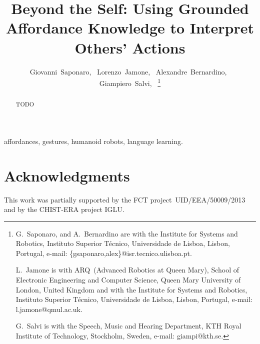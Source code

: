 \documentclass[journal]{IEEEtran}
\begin{document}
\title{Beyond the Self: Using Grounded Affordance Knowledge to Interpret Others' Actions}

\author{Giovanni~Saponaro,~
        Lorenzo~Jamone,~
        Alexandre~Bernardino,~
        Giampiero~Salvi,~
\thanks{G.~Saponaro, and A.~Bernardino are with the
Institute for Systems and Robotics, Instituto Superior Técnico,
Universidade de Lisboa, Lisbon, Portugal, e-mail: \{gsaponaro,alex\}@isr.tecnico.ulisboa.pt.

L.~Jamone is with ARQ~(Advanced Robotics at Queen Mary), School of Electronic Engineering and Computer Science, Queen Mary University of London, United Kingdom
and with the
Institute for Systems and Robotics, Instituto Superior Técnico, Universidade de Lisboa, Lisbon, Portugal,
e-mail: l.jamone@qmul.ac.uk.

G.~Salvi is with the Speech, Music and Hearing Department,
KTH Royal Institute of Technology, Stockholm, Sweden,
e-mail: giampi@kth.se.
}}

\maketitle

\begin{abstract}
TODO
\end{abstract}

\begin{IEEEkeywords}
affordances, gestures, humanoid robots, language learning.
\end{IEEEkeywords}











\section*{Acknowledgments}

This work was partially supported by the FCT project~UID/EEA/50009/2013 and by the CHIST-ERA project IGLU.

\printbibliography

\appendix

\end{document}
